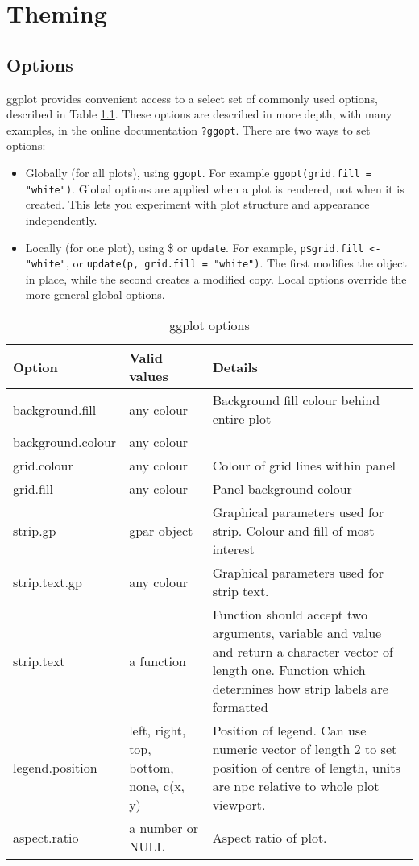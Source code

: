 

\chapter{Theming}


\section{Options}\label{sec:options}

ggplot provides convenient access to a select set of commonly used options, described in Table \ref{tbl:options}.  These options are described in more depth, with many examples, in the online documentation {\tt ?ggopt}.
There are two ways to set options:

\begin{itemize}
  \item Globally (for all plots), using {\tt ggopt}.  For example {\tt ggopt(grid.fill = "white")}.   Global options are applied when a plot is rendered, not when it is created.  This lets you experiment with plot structure and appearance independently.

  \item Locally (for one plot), using \$ or {\tt update}.  For example, {\tt p\$grid.fill <- "white"}, or {\tt update(p, grid.fill = "white")}.  The first modifies the object in place, while the second creates a modified copy. Local options override the more general global options.
\end{itemize}     


\begin{table}
\begin{tabular}{lll}
Option & Valid values & Details \\
\hline
background.fill    & any colour & Background fill colour behind entire plot\\
background.colour  & any colour & \\
grid.colour        & any colour & Colour of grid lines within panel \\
grid.fill          & any colour & Panel background colour \\
strip.gp           & gpar object & Graphical parameters used for strip. Colour and fill of most interest \\
strip.text.gp      & any colour & Graphical parameters used for strip text. \\
strip.text         & a function & Function should accept two arguments, variable and value and return a character vector of length one. Function which determines how strip labels are formatted \\
legend.position    & left, right, top, bottom, none, c(x, y) & Position of legend.  Can use numeric vector of length 2 to set position of centre of length, units are npc relative to whole plot viewport. \\
aspect.ratio       & a number or NULL & Aspect ratio of plot. \\
\hline
\end{tabular}
  \caption{ggplot options}
  \label{tbl:options}
\end{table}

